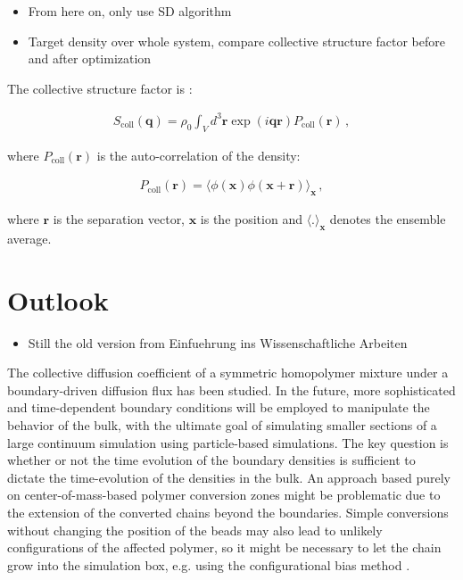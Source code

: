 \documentclass[bachelor,       %
               twoside,        %
               BCOR10mm,       %
               ngerman, english %
               ]{GAUBM}
\begin{document}
\begin{itemize}
    \item From here on, only use SD algorithm
    \item Target density over whole system, compare collective structure factor before and after optimization
\end{itemize}

The collective structure factor is \cite{Reister02}:

\begin{align}
    S_\text{coll}(\mathbf q)=\rho_0\int_Vd^3\mathbf r\exp(i\mathbf{qr})P_\text{coll}(\mathbf r)\,,
\end{align}
 
where $P_\text{coll}(\mathbf r)$ is the auto-correlation of the density:

\begin{align}
    P_\text{coll}(\mathbf r)=\langle\phi(\mathbf x)\phi(\mathbf x +\mathbf r)\rangle_{\mathbf{x}}\,,
\end{align}
 
where $\mathbf{r}$ is the separation vector, $\mathbf x$ is the position and $\langle .\rangle_\mathbf x$ denotes the ensemble average.
 
\chapter{Outlook}

\begin{itemize}
    \item Still the old version from Einfuehrung ins Wissenschaftliche Arbeiten
\end{itemize}

The collective diffusion coefficient of a symmetric homopolymer mixture under a boundary-driven diffusion flux has been studied. In the future, more sophisticated and time-dependent boundary conditions will be employed to manipulate the behavior of the bulk, with the ultimate goal of simulating smaller sections of a large continuum simulation using particle-based simulations. The key question is whether or not the time evolution of the boundary densities is sufficient to dictate the time-evolution of the densities in the bulk. An approach based purely on center-of-mass-based polymer conversion zones might be problematic due to the extension of the converted chains beyond the boundaries. Simple conversions without changing the position of the beads may also lead to unlikely configurations of the affected polymer, so it might be necessary to let the chain grow into the simulation box, e.g. using the configurational bias method \cite{ConfBias}.
\appendix
\end{document}
